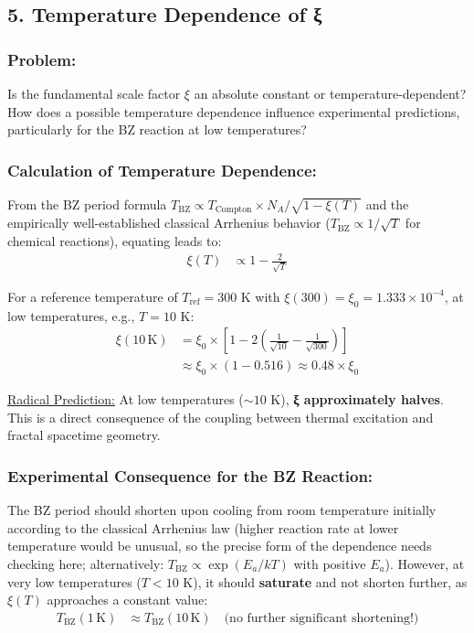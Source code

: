 \documentclass[12pt,a4paper]{article}
\begin{document}
	\subsection*{5. Temperature Dependence of ξ}
	
	\subsubsection*{Problem:}
	Is the fundamental scale factor $\xi$ an absolute constant or temperature-dependent? How does a possible temperature dependence influence experimental predictions, particularly for the BZ reaction at low temperatures?
	
	\subsubsection*{Calculation of Temperature Dependence:}
	
	From the BZ period formula $T_{\text{BZ}} \propto T_{\text{Compton}} \times N_A / \sqrt{1 - \xi(T)}$ and the empirically well-established classical Arrhenius behavior ($T_{\text{BZ}} \propto 1/\sqrt{T}$ for chemical reactions), equating leads to:
	\begin{align*}
		\xi(T) &\propto 1 - \frac{2}{\sqrt{T}}
	\end{align*}
	
	For a reference temperature of $T_{\text{ref}} = 300$ K with $\xi(300) = \xi_0 = 1.333 \times 10^{-4}$, at low temperatures, e.g., $T = 10$ K:
	\begin{align*}
		\xi(10 \, \text{K}) &= \xi_0 \times \left[1 - 2\left(\frac{1}{\sqrt{10}} - \frac{1}{\sqrt{300}}\right)\right] \\
		&\approx \xi_0 \times (1 - 0.516) \approx 0.48 \times \xi_0
	\end{align*}
	
	\underline{Radical Prediction:} At low temperatures ($\sim 10$ K), \textbf{ξ approximately halves}. This is a direct consequence of the coupling between thermal excitation and fractal spacetime geometry.
	
	\subsubsection*{Experimental Consequence for the BZ Reaction:}
	
	The BZ period should shorten upon cooling from room temperature initially according to the classical Arrhenius law (higher reaction rate at lower temperature would be unusual, so the precise form of the dependence needs checking here; alternatively: $T_{\text{BZ}} \propto \exp(E_a/kT)$ with positive $E_a$). However, at very low temperatures ($T < 10$ K), it should \textbf{saturate} and not shorten further, as $\xi(T)$ approaches a constant value:
	\begin{align*}
		T_{\text{BZ}}(1 \, \text{K}) &\approx T_{\text{BZ}}(10 \, \text{K}) \quad \text{(no further significant shortening!)}
	\end{align*}
	
\end{document}
